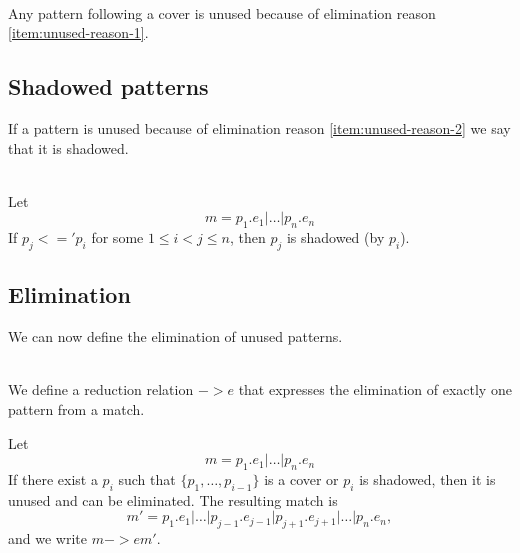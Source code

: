 \begin{lemma}\ \\
  Any pattern following a cover is unused because of elimination reason
  \ref{item:unused-reason-1}.
\end{lemma}

\subsection{Shadowed patterns}
\label{sec:shadowed-patterns}
If a pattern is unused because of elimination reason \ref{item:unused-reason-2} we say that
it is shadowed.
\begin{definition}[Shadowed]\ \\
  Let
  \[
  m = p_1\texttt{.}e_1 \texttt{|} \ldots \texttt{|} p_n\texttt{.}e_n
  \]
  If $p_j <=' p_i$ for some $1 \leq i < j \leq n$, then $p_j$ is shadowed (by
  $p_i$).
\end{definition}

\subsection{Elimination}

We can now define the elimination of unused patterns.
\begin{definition}[Elimination, $->e$]\ \\
\label{def:shadowed-patterns-1}
  We define a reduction relation $->e$ that expresses the
  elimination of exactly one pattern from a match.

  Let
  \[
  m = p_1\texttt{.}e_1 \texttt{|} \ldots \texttt{|} p_n\texttt{.}e_n
  \]
  If there exist a $p_i$ such that $\{p_1, \ldots, p_{i-1}\}$ is a cover or
  $p_i$ is shadowed, then it is unused and can be eliminated. The resulting
  match is
  \[
  m' = p_1\texttt{.}e_1 \texttt{|} \ldots \texttt{|}
  p_{j-1}\texttt{.}e_{j-1} \texttt{|} p_{j+1}\texttt{.}e_{j+1} \texttt{|}
  \ldots \texttt{|} p_n\texttt{.}e_n,
  \]
  and we write $m ->e m'$.
\end{definition}

